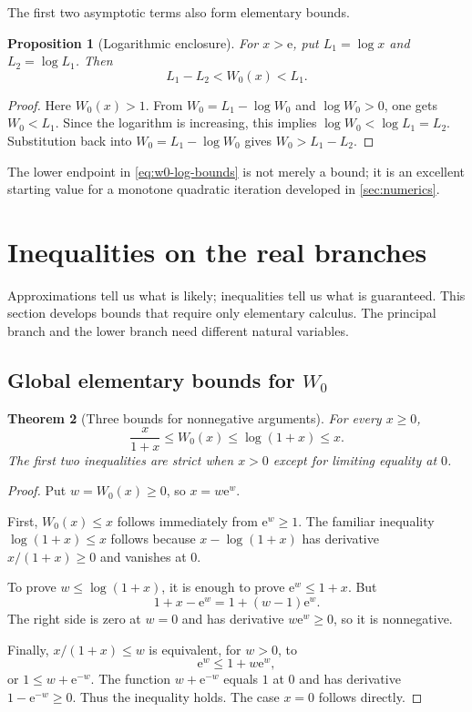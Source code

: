 \documentclass[11pt]{article}
\numberwithin{equation}{section}
\newtheorem{theorem}{Theorem}[section]
\newtheorem{proposition}[theorem]{Proposition}
\theoremstyle{definition}
\theoremstyle{remark}
\newcommand{\e}{\mathrm e}
\begin{document}
The first two asymptotic terms also form elementary bounds.

\begin{proposition}[Logarithmic enclosure]
\label{prop:w0-log-bounds}
For $x>\e$, put $L_1=\log x$ and $L_2=\log L_1$.  Then
\begin{equation}
  L_1-L_2<W_0(x)<L_1.                                 \label{eq:w0-log-bounds}
\end{equation}
\end{proposition}

\begin{proof}
Here $W_0(x)>1$.  From
$W_0=L_1-\log W_0$ and $\log W_0>0$, one gets $W_0<L_1$.  Since the logarithm
is increasing, this implies $\log W_0<\log L_1=L_2$.  Substitution back into
$W_0=L_1-\log W_0$ gives $W_0>L_1-L_2$.
\end{proof}

The lower endpoint in \eqref{eq:w0-log-bounds} is not merely a bound; it is an
excellent starting value for a monotone quadratic iteration developed in
\cref{sec:numerics}.

\section{Inequalities on the real branches}
\label{sec:bounds}

Approximations tell us what is likely; inequalities tell us what is guaranteed.
This section develops bounds that require only elementary calculus.  The
principal branch and the lower branch need different natural variables.

\subsection{Global elementary bounds for \texorpdfstring{$W_0$}{W0}}

\begin{theorem}[Three bounds for nonnegative arguments]
\label{thm:w0-elementary-bounds}
For every $x\ge0$,
\begin{equation}
  \frac{x}{1+x}\le W_0(x)\le\log(1+x)\le x.           \label{eq:w0-elementary-bounds}
\end{equation}
The first two inequalities are strict when $x>0$ except for limiting equality
at $0$.
\end{theorem}

\begin{proof}
Put $w=W_0(x)\ge0$, so $x=w\e^w$.

First, $W_0(x)\le x$ follows immediately from $\e^w\ge1$.  The familiar
inequality $\log(1+x)\le x$ follows because
$x-\log(1+x)$ has derivative $x/(1+x)\ge0$ and vanishes at $0$.

To prove $w\le\log(1+x)$, it is enough to prove $\e^w\le1+x$.  But
\[
  1+x-\e^w=1+(w-1)\e^w.
\]
The right side is zero at $w=0$ and has derivative $w\e^w\ge0$, so it is
nonnegative.

Finally, $x/(1+x)\le w$ is equivalent, for $w>0$, to
\[
  \e^w\le1+w\e^w,
\]
or $1\le w+\e^{-w}$.  The function
$w+\e^{-w}$ equals $1$ at $0$ and has derivative $1-\e^{-w}\ge0$.  Thus the
inequality holds.  The case $x=0$ follows directly.
\end{proof}
\end{document}
